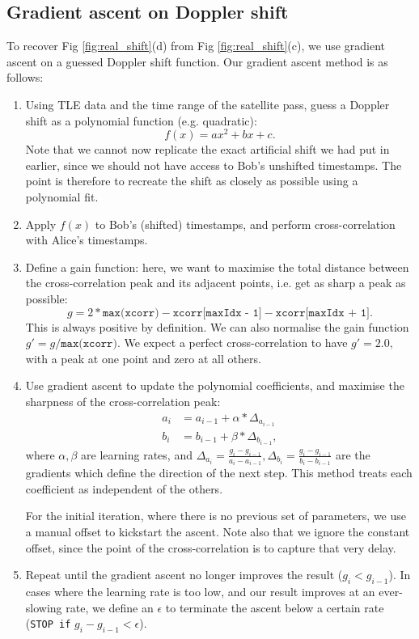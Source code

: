 \subsection{Gradient ascent on Doppler shift}

To recover Fig \ref{fig:real_shift}(d) from Fig \ref{fig:real_shift}(c), we use gradient ascent on a guessed Doppler shift function. Our gradient ascent method is as follows:

\begin{enumerate}

	\item Using TLE data and the time range of the satellite pass, guess a Doppler shift as a polynomial function (e.g. quadratic):
	\begin{equation}
		f(x) = ax^2 + bx + c.
	\end{equation}
	Note that we cannot now replicate the exact artificial shift we had put in earlier, since we should not have access to Bob's unshifted timestamps. The point is therefore to recreate the shift as closely as possible using a polynomial fit.
	\item Apply $f(x)$ to Bob's (shifted) timestamps, and perform cross-correlation with Alice's timestamps. 
	\item Define a gain function: here, we want to maximise the total distance between the cross-correlation peak and its adjacent points, i.e. get as sharp a peak as possible: 
	\begin{equation}
		g = 2*\texttt{max(xcorr)} - \texttt{xcorr[maxIdx - 1]} - \texttt{xcorr[maxIdx + 1]}.
	\end{equation}
	This is always positive by definition. We can also normalise the gain function $g' = g / \texttt{max(xcorr)}$. We expect a perfect cross-correlation to have $g' = 2.0,$ with a peak at one point and zero at all others.
	\item Use gradient ascent to update the polynomial coefficients, and maximise the sharpness of the cross-correlation peak:
	\begin{align*}
		a_i &= a_{i-1} + \alpha*\Delta_{a_{i-1}}\\
		b_i &= b_{i-1} + \beta*\Delta_{b_{i-1}},
	\end{align*} 
	where $\alpha, \beta$ are learning rates, and $\Delta_{a_i} = \frac{g_i - g_{i-1}}{a_i - a_{i-1}}, \Delta_{b_i} = \frac{g_i - g_{i-1}}{b_i - b_{i-1}}$ are the gradients which define the direction of the next step. This method treats each coefficient as independent of the others.
	
	For the initial iteration, where there is no previous set of parameters, we use a manual offset to kickstart the ascent. Note also that we ignore the constant offset, since the point of the cross-correlation is to capture that very delay.
	\item Repeat until the gradient ascent no longer improves the result ($g_i < g_{i-1}$). In cases where the learning rate is too low, and our result improves at an ever-slowing rate, we define an $\epsilon$ to terminate the ascent below a certain rate (\texttt{STOP if} $g_i - g_{i-1} < \epsilon$).
	
\end{enumerate}
 